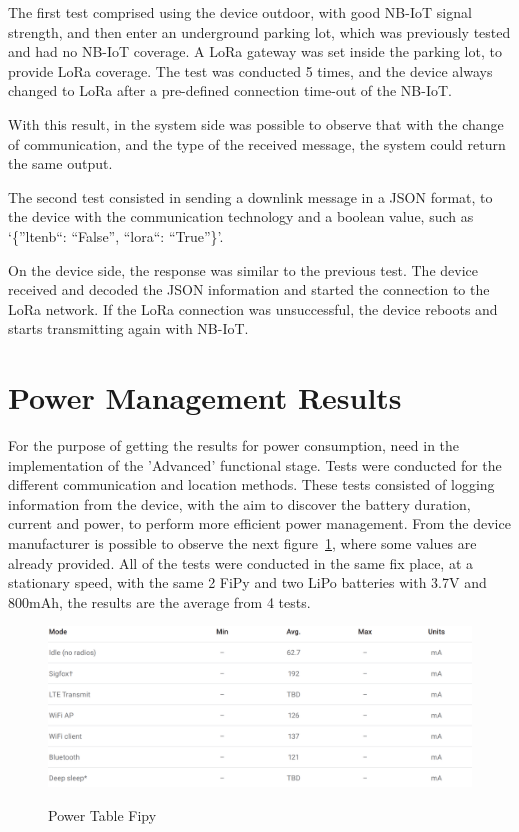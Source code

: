 The first test comprised using the device outdoor, with good NB-IoT signal strength, and then enter an underground parking lot, which was previously tested and had no NB-IoT coverage. A LoRa gateway was set inside the parking lot, to provide LoRa coverage. The test was conducted 5 times, and the device always changed to LoRa after a pre-defined connection time-out of the NB-IoT.

With this result, in the system side was possible to observe that with the change of communication, and the type of the received message, the system could return the same output.

The second test consisted in sending a downlink message in a JSON format, to the device with the communication technology and a boolean value, such as ‘\{”ltenb“: “False”, “lora“: “True”\}’. 

On the device side, the response was similar to the previous test. The device received and decoded the JSON information and started the connection to the LoRa network. If the LoRa connection was unsuccessful, the device reboots and starts transmitting again with NB-IoT.


\newpage
\section{Power Management Results}
\label{subsec:power_management}

For the purpose of getting the results for power consumption, need in the implementation of the 'Advanced'  functional stage.   Tests were conducted for the different communication  and location methods. These tests consisted of logging information from the device, with the aim to discover the battery duration, current and power, to perform  more efficient power management. From the device manufacturer is possible to observe the next figure~\ref{fig:PowerTableAll}, where some values are already provided. All of the tests were conducted in the same fix place, at a  stationary speed, with the same 2 FiPy and two LiPo batteries with 3.7V and 800mAh, the results are the average from 4 tests.

\begin{figure}[htbp]
  \centering
  
    {\includegraphics[width=0.93\linewidth]{Chapters/Figures/power1.PNG}}%
 
  \caption{Power Table Fipy~\cite{Microcontroller2017}}
  \label{fig:PowerTableAll}
\end{figure}


